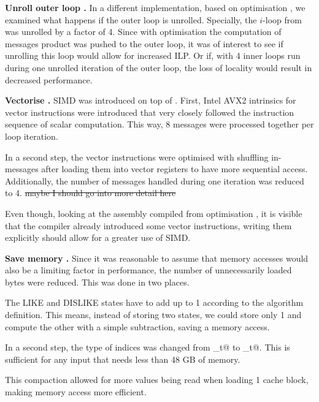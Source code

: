 \documentclass[draft,letterpaper]{article}
\let\cref=\Cref %
\newcommand{\mypar}[1]{{\bf #1.}}
\begin{document}
\mypar{Unroll outer loop }
In a different implementation, based on optimisation , we examined what happens if the outer loop is unrolled. Specially, the $i$-loop from \cref{algo:propagate} was unrolled by a factor of 4. Since with optimisation  the computation of messages product was pushed to the outer loop, it was of interest to see if unrolling this loop would allow for increased ILP. Or if, with 4 inner loops run during one unrolled iteration of the outer loop, the loss of locality would result in decreased performance.

\mypar{Vectorise }
SIMD was introduced on top of . First, Intel AVX2 intrinsics for vector instructions were introduced that very closely followed the instruction sequence of scalar computation. This way, 8 messages were processed together per loop iteration.

In a second step, the vector instructions were optimised with shuffling in-messages after loading them into vector registers to have more sequential access. Additionally, the number of messages handled during one iteration was reduced to 4. \st{maybe I should go into more detail here}
 
Even though, looking at the assembly compiled from optimisation , it is visible that the compiler already introduced some vector instructions, writing them explicitly should allow for a greater use of SIMD. 



\mypar{Save memory }
Since it was reasonable to assume that memory accesses would also be a limiting factor in performance, the number of unnecessarily loaded bytes were reduced. This was done in two places.

The LIKE and DISLIKE states have to add up to 1 according to the algorithm definition. This means, instead of storing two states, we could store only 1 and compute the other with a simple subtraction, saving a memory access.

In a second step, the type of indices was changed from \verb@size_t@ to _t@. This is sufficient for any input that needs less than 48 GB of memory. 


This compaction allowed for more values being read when loading 1 cache block, making memory access more efficient.
\end{document}
